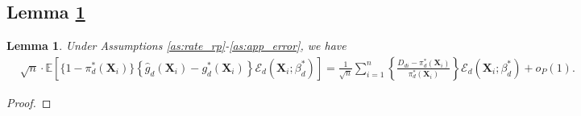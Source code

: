 \documentclass[11pt]{article}
\newtheorem{lemma}[thm]{Lemma}
\numberwithin{equation}{section}
\begin{document}
\subsection{Lemma \ref{lemma:projection}}
\begin{lemma}\label{lemma:projection}
	Under Assumptions \ref{as:rate_rp}-\ref{as:app_error},  we have
	\begin{align*}
		&\sqrt{n}\cdot\mathbb{E}\left[\{1-\pi_d^*(\boldsymbol{X}_i)\}\left\{\widehat{g}_d(\boldsymbol{X}_{i})-g^*_d(\boldsymbol{X}_{i})\right\}\mathcal{E}_d(\boldsymbol{X}_{i};\beta_d^*)\right]=\frac{1}{\sqrt{n}}\sum_{i=1}^n\left\{\frac{D_{di}-\pi_d^*(\boldsymbol{X}_{i})}{\pi_d^*(\boldsymbol{X}_{i})}\right\}\mathcal{E}_d(\boldsymbol{X}_{i};\beta_d^*)+o_P(1).
	\end{align*}
\end{lemma}
\begin{proof}
	
	
	

\end{proof}
\end{document}
